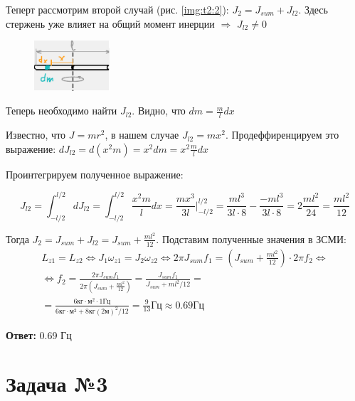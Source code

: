 \documentclass[a4paper,12pt]{article}
\begin{document}
    Теперт рассмотрим второй случай (рис. \ref{img:t2:2}): $J_2 = J_{sum} + J_{l2}$. Здесь стержень
    уже влияет на общий момент инерции $\Rightarrow$ $J_{l2} \neq 0$

    \begin{figure}
        \centering
        \includegraphics[width=0.25\textwidth]{01_05}
    \end{figure}

    Теперь необходимо найти $J_{l2}$. Видно, что $dm = \frac{m}{l}dx$

    Известно, что $J = mr^2$, в нашем случае $J_{l2} = mx^2$. Продеффиренцируем это
    выражение: $dJ_{l2} = d(x^2m) = x^2dm = x^2 \frac{m}{l}dx$

    Проинтегрируем полученное выражение:

    \begin{equation}
        J_{l2} = \int_{-l/2}^{l/2}dJ_{l2} = \int_{-l/2}^{l/2}\frac{x^2m}{l}dx =
        \frac{mx^3}{3l}|_{-l/2}^{l/2} = \frac{ml^3}{3l \cdot 8} - \frac{-ml^3}{3l\cdot 8}
        = 2\frac{ml^2}{24} = \frac{ml^2}{12}
    \end{equation}

    Тогда $J_2 = J_{sum} + J_{l2} = J_{sum} + \frac{ml^2}{12}$. Подставим полученные значения в ЗСМИ:
    \begin{multline}
        L_{z1} = L_{z2} \Leftrightarrow
        J_1\omega_{z1} = J_2\omega_{z2} \Leftrightarrow
        2\pi J_{sum}f_1 = (J_{sum} + \frac{ml^2}{12})\cdot 2\pi f_2 \Leftrightarrow \\
        \Leftrightarrow
        f_2 = \frac{2\pi J_{sum}f_1}{2\pi(J_{sum} + \frac{ml^2}{12})} =
        \frac{J_{sum}f_1}{J_{sum} + ml^2/12} = \\
        = \frac{6\text{кг}\cdot\text{м}^2 \cdot 1\text{Гц}}{6\text{кг}\cdot\text{м}^2 + 8\text{кг} (2\text{м})^2/12}
        = \frac{9}{13}\text{Гц} \approx 0.69 \text{Гц}
    \end{multline}

    \begin{flushright}
        \textbf{Ответ:} 0.69 Гц
    \end{flushright}

    \section*{Задача №3}
\end{document}
